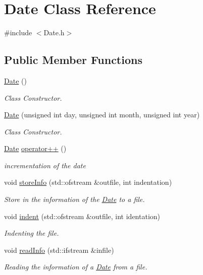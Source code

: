 \hypertarget{class_date}{}\section{Date Class Reference}
\label{class_date}


{\ttfamily \#include $<$Date.\+h$>$}

\subsection*{Public Member Functions}
\begin{DoxyCompactItemize}
\item 
\mbox{\hyperlink{class_date_a4e59ed4ba66eec61c27460c5d09fa1bd}{Date}} ()
\begin{DoxyCompactList}\small\item\em Class Constructor. \end{DoxyCompactList}\item 
\mbox{\hyperlink{class_date_a28c6604a0f8ed8216becf24abc20cf5b}{Date}} (unsigned int day, unsigned int month, unsigned int year)
\begin{DoxyCompactList}\small\item\em Class Constructor. \end{DoxyCompactList}\item 
\mbox{\hyperlink{class_date}{Date}} \mbox{\hyperlink{class_date_a0c5386da90c6834a3e7a110b02e2abaa}{operator++}} ()
\begin{DoxyCompactList}\small\item\em incrementation of the date \end{DoxyCompactList}\item 
void \mbox{\hyperlink{class_date_a9385a826469d0978e3491bdff9739f6f}{store\+Info}} (std\+::ofstream \&outfile, int indentation)
\begin{DoxyCompactList}\small\item\em Store in the information of the \mbox{\hyperlink{class_date}{Date}} to a file. \end{DoxyCompactList}\item 
void \mbox{\hyperlink{class_date_af439b0bc0daf90fddce7c74017407a16}{indent}} (std\+::ofstream \&outfile, int identation)
\begin{DoxyCompactList}\small\item\em Indenting the file. \end{DoxyCompactList}\item 
void \mbox{\hyperlink{class_date_ad23dffa000ed62018a399c519acb06db}{read\+Info}} (std\+::ifstream \&infile)
\begin{DoxyCompactList}\small\item\em Reading the information of a \mbox{\hyperlink{class_date}{Date}} from a file. \end{DoxyCompactList}\end{DoxyCompactItemize}


